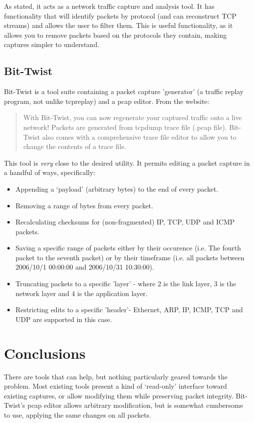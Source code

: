 \documentclass[10pt,a4paper,notitlepage,twoside]{report}
\begin{document}
As stated, it acts as a network traffic capture and analysis tool. It has functionality that will identify packets by protocol (and can reconstruct TCP streams) and allows the user to filter them. This is useful functionality, as it allows you to remove packets based on the protocols they contain, making captures simpler to understand.

\subsection{Bit-Twist}
Bit-Twist is a tool suite containing a packet capture 'generator' (a traffic replay program, not unlike tcpreplay\cite{tcpreplay-web}) and a pcap editor.
From the website\cite{bittwist-web}:

\begin{quote}
With Bit-Twist, you can now regenerate your captured traffic onto a live network! Packets are generated from tcpdump trace file (.pcap file). Bit-Twist also comes with a comprehensive trace file editor to allow you to change the contents of a trace file.
\end{quote}

This tool is \emph{very} close to the desired utility. It permits editing a packet capture in a handful of ways, specifically:
\begin{itemize}
\item Appending a `payload' (arbitrary bytes) to the end of every packet.
\item Removing a range of bytes from every packet.
\item Recalculating checksums for (non-fragmented) IP, TCP, UDP and ICMP packets.
\item Saving a specific range of packets either by their occurence (i.e. The fourth packet to the seventh packet) or by their timeframe (i.e. all packets between 2006/10/1 00:00:00 and 2006/10/31 10:30:00).
\item Truncating packets to a specific 'layer' - where 2 is the link layer, 3 is the network layer and 4 is the application layer.
\item Restricting edits to a specific 'header'- Ethernet, ARP, IP, ICMP, TCP and UDP are supported in this case.
\end{itemize}

\section{Conclusions}
There are tools that can help, but nothing particularly geared towards the problem. Most existing tools present a kind of `read-only' interface toward existing captures, or allow modifying them while preserving packet integrity. Bit-Twist's pcap editor allows arbitrary modification, but is somewhat cumbersome to use, applying the same changes on all packets.
\end{document}
